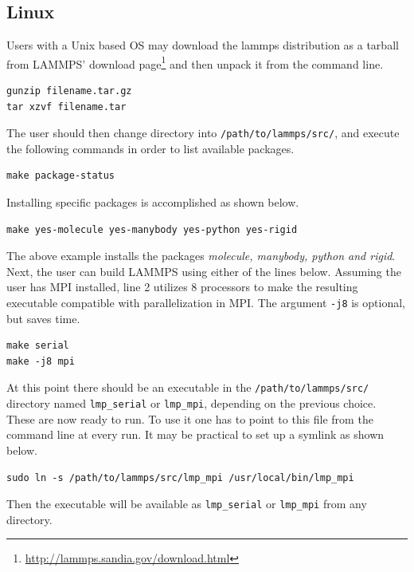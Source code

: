 \documentclass[twoside,english]{uiofysmaster}
\begin{document}
\subsection{Linux}
Users with a Unix based OS may download the lammps distribution as a tarball from LAMMPS' download page\footnote{\href{http://lammps.sandia.gov/download.html}{http://lammps.sandia.gov/download.html}} and then unpack it from the command line.
\begin{lstlisting}
gunzip filename.tar.gz
tar xzvf filename.tar
\end{lstlisting}
The user should then change directory into \texttt{/path/to/lammps/src/}, and execute the following commands in order to list available packages. 
\begin{lstlisting}
make package-status
\end{lstlisting}
Installing specific packages is accomplished as shown below.
\begin{lstlisting}
make yes-molecule yes-manybody yes-python yes-rigid 
\end{lstlisting}
The above example installs the packages \textit{molecule, manybody, python and rigid}.
Next, the user can build LAMMPS using either of the lines below. 
Assuming the user has MPI installed, line 2 utilizes 8 processors to make the resulting executable compatible with parallelization in MPI. The argument \texttt{-j8} is optional, but saves time.
\begin{lstlisting}
make serial
make -j8 mpi
\end{lstlisting}
At this point there should be an executable in the \texttt{/path/to/lammps/src/} directory named \texttt{lmp\_serial} or \texttt{lmp\_mpi}, depending on the previous choice. These are now ready to run.
To use it one has to point to this file from the command line at every run. It may be practical to set up a symlink as shown below.
\begin{lstlisting}
sudo ln -s /path/to/lammps/src/lmp_mpi /usr/local/bin/lmp_mpi
\end{lstlisting}
Then the executable will be available as \texttt{lmp\_serial} or \texttt{lmp\_mpi} from any directory. 
\end{document}

